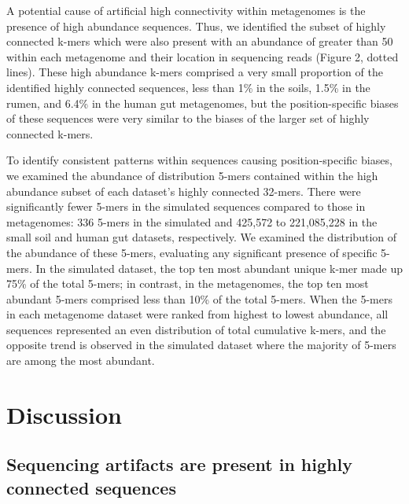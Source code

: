 \documentclass[10pt]{article}
\begin{document}
A potential cause of artificial high connectivity within metagenomes is the presence of high abundance sequences.  Thus, we identified the subset of highly connected k-mers which were also present with an abundance of greater than 50 within each metagenome and their location in sequencing reads (Figure 2, dotted lines).   These high abundance k-mers comprised a very small proportion of the identified highly connected sequences, less than 1\% in the soils, 1.5\% in the rumen, and 6.4\% in the human gut metagenomes, but the position-specific biases of these sequences were very similar to the biases of the larger set of highly connected k-mers.

To identify consistent patterns within sequences causing position-specific biases, we examined the abundance of distribution 5-mers contained within the high abundance subset of each dataset's highly connected 32-mers.   There were significantly fewer 5-mers in the simulated sequences compared to those in metagenomes: 336 5-mers in the simulated and 425,572 to 221,085,228 in the small soil and human gut datasets, respectively.  We examined the distribution of the abundance of these 5-mers, evaluating any significant presence of specific 5-mers.  In the simulated dataset, the top ten most abundant unique k-mer made up 75\% of the total 5-mers; in contrast, in the metagenomes, the top ten most abundant 5-mers comprised less than 10\% of the total 5-mers.  When the 5-mers in each metagenome dataset were ranked from highest to lowest abundance, all sequences represented an even distribution of total cumulative k-mers, and the opposite trend is observed in the simulated dataset where the majority of 5-mers are among the most abundant.

\section*{Discussion}

\subsection*{Sequencing artifacts are present in highly connected sequences}
\end{document}
